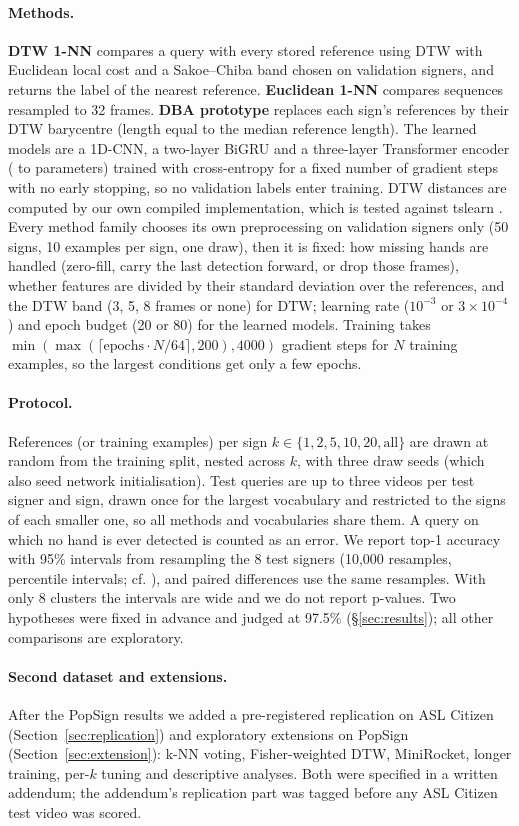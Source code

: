 \paragraph{Methods.} \textbf{DTW 1-NN} compares a query with every stored reference using DTW with Euclidean local cost
and a Sakoe--Chiba band chosen on validation signers, and returns the label of the nearest reference. \textbf{Euclidean 1-NN}
compares sequences resampled to 32 frames. \textbf{DBA prototype} replaces each sign's references by their DTW barycentre (length equal to the median reference length).
The learned models are a 1D-CNN, a two-layer BiGRU and a three-layer Transformer encoder (\nParamsTrans{} to \nParamsGru{} parameters) trained
with cross-entropy for a fixed number of gradient steps with no early stopping, so no validation labels enter training. DTW
distances are computed by our own compiled implementation, which is tested against tslearn \citep{tavenard2020tslearn}.
Every method family chooses its own preprocessing on validation signers only (50 signs, 10 examples per sign, one draw), then it is fixed: how missing hands are handled (zero-fill, carry the last detection forward, or drop those frames), whether features are divided by their standard deviation over the references, and the DTW band (3, 5, 8 frames or none) for DTW; learning rate ($10^{-3}$ or $3\times10^{-4}$) and epoch budget (20 or 80) for the learned models. Training takes $\min(\max(\lceil \text{epochs}\cdot N/64\rceil,200),4000)$ gradient steps for $N$ training examples, so the largest conditions get only a few epochs.

\paragraph{Protocol.} References (or training examples) per sign $k\in\{1,2,5,10,20,\text{all}\}$ are drawn at random from the
training split, nested across $k$, with three draw seeds (which also seed network initialisation). Test queries are up to
three videos per test signer and sign, drawn once for the largest vocabulary and restricted to the signs of each smaller one, so all methods and vocabularies share them. A query on which no hand is ever detected is
counted as an error. We report top-1 accuracy with 95\% intervals from resampling the 8 test signers (10{,}000 resamples,
percentile intervals; cf. \citealp{field2007cluster}), and paired differences use the same resamples. With only 8 clusters
the intervals are wide and we do not report p-values. Two hypotheses were fixed in advance and judged at 97.5\%
(\S\ref{sec:results}); all other comparisons are exploratory.

\paragraph{Second dataset and extensions.} After the PopSign results we added a pre-registered replication on ASL Citizen
(Section~\ref{sec:replication}) and exploratory extensions on PopSign (Section~\ref{sec:extension}): k-NN voting, Fisher-weighted DTW, MiniRocket,
longer training, per-$k$ tuning and descriptive analyses. Both were specified in a written addendum; the addendum's replication part was
tagged before any ASL Citizen test video was scored.
